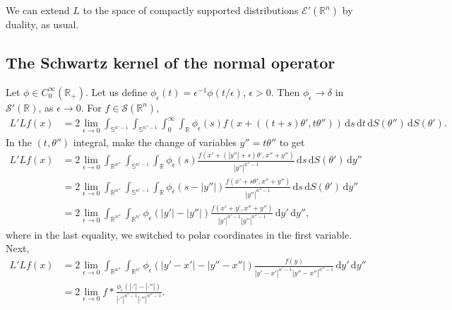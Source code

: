 \documentclass[11pt]{amsart}
\theoremstyle{definition}
\theoremstyle{remark}
\numberwithin{equation}{section}
\newcommand{\Rn}{\mathbb{R}^n}
\newcommand{\rb}{\mathbb{R}}
\renewcommand{\d}{\,\mathrm{d}}
\renewcommand{\sb}{\mathbb{S}}
\begin{document}
 We can extend $L$ to the space of compactly supported distributions $\mathcal{E}'(\rb^n)$ by duality, as usual. 

\subsection{The Schwartz kernel of the normal operator}
Let $\phi \in C_0^\infty(\rb_+)$. Let us define $\phi_\epsilon (t) = \epsilon^{-1} \phi(t/\epsilon)$, $\epsilon>0$. Then $\phi_\epsilon\to\delta$ in $\mathcal{S}'(\rb)$, as $\epsilon\to 0$.
For $f\in \mathcal{S}(\Rn)$, 
\begin{align*}
    L'Lf(x) &= 2 \lim_{\epsilon \to 0} \int_{\sb^{n'-1}} \int_{\sb^{n''-1}} \int_{0}^\infty \int_{\rb}  \phi_\epsilon(s) f ( x+((t+s)\theta',t\theta'' )) \d s \d  t \d S(\theta'') \d S(\theta').
\end{align*}
In the $(t,\theta'')$ integral, make the change of variables $y''=t\theta''$ to get
\begin{align*}
    L'Lf(x) &= 2 \lim_{\epsilon \to 0} \int_{\rb^{n''}} \int_{\sb^{n'-1}} \int_{\rb} \phi_\epsilon(s) \frac{f(x'+(|y''|+s)\theta', x''+y'')}{|y''|^{n''-1}} \d s \d S(\theta') \d y'' \\
    &= 2 \lim_{\epsilon \to 0} \int_{\rb^{n''}} \int_{\sb^{n'-1}} \int_{\rb} \phi_\epsilon(s-|y''|) \frac{f(x'+s\theta', x''+y'')}{|y''|^{n''-1}} \d s \d S(\theta') \d y'' \\
    &= 2 \lim_{\epsilon \to 0} \int_{\rb^{n''}} \int_{\rb^{n'} } \phi_\epsilon(|y'|-|y''|) \frac{f\left( x'+y',x''+y''\right)}{|y'|^{n'-1}|y''|^{n''-1}} \d y' \d y'',
\end{align*}
where in the  last equality, we switched to polar coordinates in the first variable. Next,
\begin{align}
    L'Lf(x) &= 2 \lim_{\epsilon \to 0}  \int_{\rb^{n''}} \int_{\rb^{n'} } \phi_\epsilon \left(|y'-x'|-|y''-x''|\right) \frac{f\left(y\right)}{|y'-x'|^{n'-1}|y''-x''|^{n''-1}} \d y' \d y'' \\
    &= 2 \lim_{\epsilon \to 0}  f \ast \frac{\phi_\epsilon(|\cdot'|-|\cdot''|)}{|\cdot '|^{n'-1} |\cdot ''|^{n''-1}}. \label{lim}
\end{align}
\end{document}
